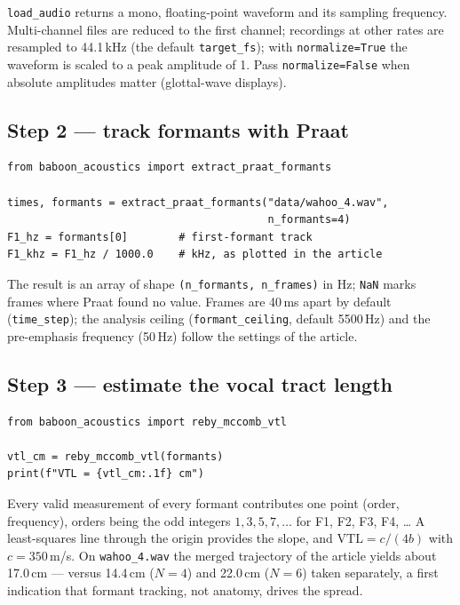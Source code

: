 \documentclass[11pt,a4paper]{article}
\begin{document}
\texttt{load\_audio} returns a mono, floating-point waveform and its
sampling frequency. Multi-channel files are reduced to the first
channel; recordings at other rates are resampled to 44.1\,kHz
(the default \texttt{target\_fs}); with \texttt{normalize=True} the
waveform is scaled to a peak amplitude of 1. Pass
\texttt{normalize=False} when absolute amplitudes matter (glottal-wave
displays).

\subsection{Step 2 --- track formants with Praat}

\begin{lstlisting}
from baboon_acoustics import extract_praat_formants

times, formants = extract_praat_formants("data/wahoo_4.wav",
                                         n_formants=4)
F1_hz = formants[0]        # first-formant track
F1_khz = F1_hz / 1000.0    # kHz, as plotted in the article
\end{lstlisting}

The result is an array of shape \texttt{(n\_formants, n\_frames)} in
Hz; \texttt{NaN} marks frames where Praat found no value. Frames are
40\,ms apart by default (\texttt{time\_step}); the analysis ceiling
(\texttt{formant\_ceiling}, default 5500\,Hz) and the pre-emphasis
frequency (50\,Hz) follow the settings of the article.

\subsection{Step 3 --- estimate the vocal tract length}

\begin{lstlisting}
from baboon_acoustics import reby_mccomb_vtl

vtl_cm = reby_mccomb_vtl(formants)
print(f"VTL = {vtl_cm:.1f} cm")
\end{lstlisting}

Every valid measurement of every formant contributes one point
(order, frequency), orders being the odd integers $1, 3, 5, 7, \ldots$
for F1, F2, F3, F4, \ldots{} A least-squares line through the origin
provides the slope, and $\mathrm{VTL} = c/(4b)$ with $c = 350$\,m/s.
On \texttt{wahoo\_4.wav} the merged trajectory of the article yields
about 17.0\,cm --- versus 14.4\,cm ($N{=}4$) and 22.0\,cm ($N{=}6$)
taken separately, a first indication that formant tracking, not
anatomy, drives the spread.
\end{document}
